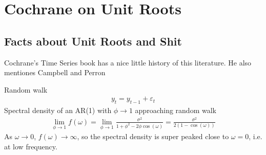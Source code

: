 \documentclass[12pt]{article}
\theoremstyle{plain}
\newtheorem{lem}[thm]{Lemma}
\theoremstyle{definition}
\theoremstyle{remark}
\newcommand{\ra}{\rightarrow}
\newcommand{\limn}{\lim_{n\rightarrow\infty}}
\begin{document}
\begin{comment}
\clearpage
\begin{lem}
The following limit statements are equivalent
\begin{align*}
  \frac{1}{-\log G(x)}
  &=\lim_{n\ra\infty} \frac{1}{n\big(1-F(a_nx+b_n)\big)}
  \quad\iff\quad
  D(x)
  =
  \limn
  \frac{U(nx)-b_n}{a_n}
\end{align*}
\end{lem}
\begin{proof}
Write out the second limit statement using the defintion of $D(x)$ and
$U(t)$:
\begin{align*}
  G^{-1}(e^{-1/x})
  =
  \limn
  \frac{H^{-1}(nx)-b_n}{a_n}
\end{align*}
Compute the inverse functions of the LHS and RHS
\begin{align*}
  y = G^{-1}(e^{-1/x})
  \quad&\implies\quad
  x = \frac{1}{-\log G(y)}
  \\
  y= \frac{H^{-1}(nx)-b_n}{a_n}
  \quad&\implies\quad
  x
  = \frac{1}{n}H(a_ny+b_n)
  = \frac{1}{n(1-F(a_ny+b_n)}
\end{align*}
Therefore, by the Lemma
\begin{align*}
  D(x)
  =
  \limn
  \frac{U(nx)-b_n}{a_n}
  \quad\implies\quad
  \frac{1}{-\log G(y)}
  =
  \limn
  \frac{1}{n(1-F(a_ny+b_n)}
\end{align*}
which is the first limit statement.
\end{proof}
\end{comment}





\clearpage
\section{Cochrane on Unit Roots}

\subsection{Facts about Unit Roots and Shit}

Cochrane's Time Series book has a nice little history of this
literature. He also mentiones Campbell and Perron

Random walk
\begin{align}
  y_t = y_{t-1} + \varepsilon_t
  \label{rw}
\end{align}
Spectral density of an AR(1) with $\phi\ra 1$ approaching random walk
\begin{align*}
  \lim_{\phi\ra 1}f(\omega)
  =
  \lim_{\phi\ra 1}
  \frac{\sigma^2}{1+\phi^2-2\phi \cos(\omega)}
  =
  \frac{\sigma^2}{2(1-\cos(\omega))}
\end{align*}
As $\omega\ra 0$, $f(\omega)\ra \infty$, so the spectral density is
super peaked close to $\omega=0$, i.e. at low frequency.
\end{document}
